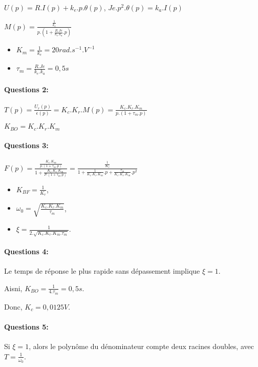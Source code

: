$U(p)=R.I(p)+k_e.p.\theta(p)$, $Je.p^2.\theta(p)=k_a.I(p)$

$M(p)=\frac{\frac{1}{k_e}}{p.(1+\frac{R.Je}{k_e.k_a}.p)}$

\begin{itemize}
 \item $K_m=\frac{1}{k_e}=20rad.s^{-1}.V^{-1}$
 \item $\tau_m=\frac{R.Je}{k_e.k_a}=0,5s$
\end{itemize}

\paragraph{Questions 2:}

$T(p)=\frac{U_r(p)}{\epsilon(p)}=K_c.K_r.M(p)=\frac{K_c.K_r.K_m}{p.(1+\tau_m.p)}$

$K_{BO}=K_c.K_r.K_m$

\paragraph{Questions 3:}

$F(p)=\frac{\frac{K_c.K_m}{p.(1+\tau_m.p)}}{1+\frac{K_c.K_r.K_m}{P.(1+\tau_m.p)}}=\frac{\frac{1}{K_r}}{1+\frac{1}{K_c.K_r.K_m}.p+\frac{\tau_m}{K_c.K_r.K_m}.p^2}$

\begin{itemize}
 \item $K_{BF}=\frac{1}{K_r}$,
 \item $\omega_0=\sqrt{\frac{K_c.K_r.K_m}{\tau_m}}$,
 \item $\xi=\frac{1}{2.\sqrt{K_c.K_r.K_m.\tau_m}}$.
\end{itemize}

\paragraph{Questions 4:}

Le temps de réponse le plus rapide sans dépassement implique $\xi=1$.

Aisni, $K_{BO}=\frac{1}{4.\tau_m}=0,5s$.

Donc, $K_c=0,0125V$.

\paragraph{Questions 5:}

Si $\xi=1$, alors le polynôme du dénominateur compte deux racines doubles, avec  $T=\frac{1}{\omega_0}$.

